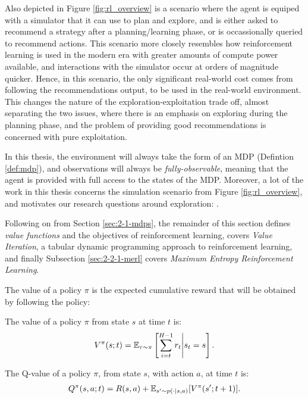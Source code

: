     Also depicted in Figure \ref{fig:rl_overview} is a scenario where the agent is equiped with a simulator that it can use to plan and explore, and is either asked to recommend a strategy after a planning/learning phase, or is occassionally queried to recommend actions. This scenario more closely resembles how reinforcement learning is used in the modern era with greater amounts of compute power available, and interactions with the simulator occur at orders of magnitude quicker. Hence, in this scenario, the only significant real-world cost comes from following the recommendations output, to be used in the real-world environment. This changes the nature of the exploration-exploitation trade off, almost separating the two issues, where there is an emphasis on exploring during the planning phase, and the problem of providing good recommendations is concerned with pure exploitation. 

    In this thesis, the environment will always take the form of an MDP (Defintion \ref{def:mdp}), and observations will always be \textit{fully-observable}, meaning that the agent is provided with full access to the states of the MDP. Moreover, a lot of the work in this thesis concerns the simulation scenario from Figure \ref{fig:rl_overview}, and motivates our research questions around exploration: \exploreq.

    Following on from Section \ref{sec:2-1-mdps}, the remainder of this section defines \textit{value functions} and the objectives of reinforcement learning, covers \textit{Value Iteration}, a tabular dynamic programming approach to reinforcement learning, and finally Subsection \ref{sec:2-2-1-merl} covers \textit{Maximum Entropy Reinforcement Learning}.
    
    The value of a policy $\pi$ is the expected cumulative reward that will be obtained by following the policy:
    \begin{defn}
        \label{def:value}
        \label{def:q_value}
        The \textnormal{value} of a policy $\pi$ from state $s$ at time $t$ is:
        \begin{align}
            V^{\pi}(s;t) = \mathbb{E}_{\tau\sim\pi}\left[\sum_{i=t}^{H-1} r_t \Bigg| s_t=s \right]. \label{eq:value_fn_def}
        \end{align} 

        The \textnormal{Q-value} of a policy $\pi$, from state $s$, with action $a$, at time $t$ is:
        \begin{align}
            Q^{\pi}(s,a;t) = R(s,a) + \mathbb{E}_{s'\sim p(\cdot|s,a)} [V^{\pi}(s';t+1)]. \label{eq:q_value_fn_def}
        \end{align} 
    \end{defn}

